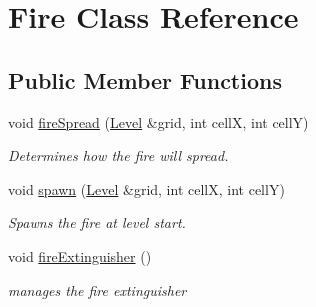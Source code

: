 \hypertarget{class_fire}{}\section{Fire Class Reference}
\label{class_fire}
\subsection*{Public Member Functions}
\begin{DoxyCompactItemize}
\item 
\mbox{\label{class_fire_af18ee6c1bed8ecf145daeeb56708b039}} 
void \hyperlink{class_fire_af18ee6c1bed8ecf145daeeb56708b039}{fire\+Spread} (\hyperlink{class_level}{Level} \&grid, int cellX, int cellY)
\begin{DoxyCompactList}\small\item\em Determines how the fire will spread. \end{DoxyCompactList}\item 
\mbox{\label{class_fire_a15f3123eb1d1afd3d4937a3287b9dc35}} 
void \hyperlink{class_fire_a15f3123eb1d1afd3d4937a3287b9dc35}{spawn} (\hyperlink{class_level}{Level} \&grid, int cellX, int cellY)
\begin{DoxyCompactList}\small\item\em Spawns the fire at level start. \end{DoxyCompactList}\item 
\mbox{\label{class_fire_acd45932783d247f80e4f2d2a043b4508}} 
void \hyperlink{class_fire_acd45932783d247f80e4f2d2a043b4508}{fire\+Extinguisher} ()
\begin{DoxyCompactList}\small\item\em manages the fire extinguisher \end{DoxyCompactList}\end{DoxyCompactItemize}
